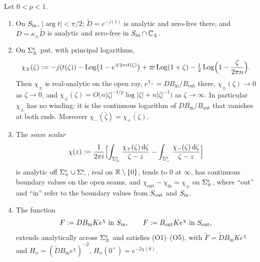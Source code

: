 \begin{lemma}\label{lem:seam}
Let $0<p<1$.
\begin{enumerate}
\item[(i)] On $S_{\mathrm{in}}$, $|\arg t|<\pi/2$; $\tilde D=e^{-j(t)}$ is analytic and zero-free there, and $D=\kappa_\pm\tilde D$ is
  analytic and zero-free in $S_{\mathrm{in}}\cap\mathbb{C}_\pm$.
\item[(ii)] On $\Sigma^{\mathrm{s}}_\pm$ put, with principal logarithms,
  \begin{equation}\label{eq:Lpm}
    \chi_\pm(\zeta):=-j(t(\zeta))-\operatorname{Log}\bigl(1-e^{\mp2\pi it(\zeta)}\bigr)+\varpi\operatorname{Log}(1+\zeta)-\tfrac12\operatorname{Log}\Bigl(1-\frac\zeta{2\pi n}\Bigr).
  \end{equation}
  Then $\chi_\pm$ is real-analytic on the open ray, $e^{\chi_\pm}=DB_{\mathrm{in}}/B_{\mathrm{out}}$ there,
  $\chi_\pm(\zeta)\to0$ as $\zeta\to0$, and $\chi_\pm(\zeta)=O\bigl(n|\zeta|^{-1/p}\log|\zeta|+n|\zeta|^{-1}\bigr)$ as
  $\zeta\to\infty$. In particular $\chi_\pm$ has no winding: it is the continuous logarithm of
  $DB_{\mathrm{in}}/B_{\mathrm{out}}$ that vanishes at both ends. Moreover $\chi_-(\bar\zeta)=\overline{\chi_+(\zeta)}$.
\item[(iii)] The \emph{seam scalar}
  \begin{equation}\label{eq:chi}
    \chi(z):=\frac1{2\pi i}\Bigl[\int_{\Sigma^{\mathrm{s}}_+}\frac{\chi_+(\zeta)\,\mathrm{d}\zeta}{\zeta-z}-\int_{\Sigma^{\mathrm{s}}_-}\frac{\chi_-(\zeta)\,\mathrm{d}\zeta}{\zeta-z}\Bigr]
  \end{equation}
  is analytic off $\Sigma^{\mathrm{s}}_+\cup\Sigma^{\mathrm{s}}_-$, real on $\mathbb{R}\setminus\{0\}$, tends to $0$ at $\infty$, has continuous boundary
  values on the open seams, and $\chi_{\mathrm{out}}-\chi_{\mathrm{in}}=\chi_\pm$ on $\Sigma^{\mathrm{s}}_\pm$, where ``out'' and
  ``in'' refer to the boundary values from $S_{\mathrm{out}}$ and $S_{\mathrm{in}}$.
\item[(iv)] The function
  \begin{equation}\label{eq:F-seam}
    F:=DB_{\mathrm{in}}Ke^{\chi}\ \text{in }S_{\mathrm{in}},\qquad F:=B_{\mathrm{out}}Ke^{\chi}\ \text{in }S_{\mathrm{out}},
  \end{equation}
  extends analytically across $\Sigma^{\mathrm{s}}_\pm$ and satisfies (O1)--(O5), with $\tilde F=\tilde DB_{\mathrm{in}}Ke^\chi$ and
  $H_n=(\tilde DB_{\mathrm{in}}e^\chi)^{-2}$, $H_n(0^+)=e^{-2\chi(0)}$.
\end{enumerate}
\end{lemma}

